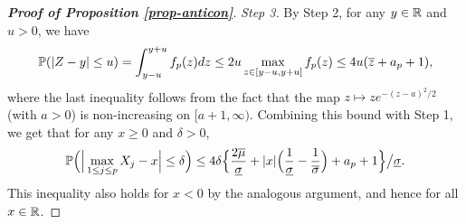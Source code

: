 \documentclass[a4paper,12pt]{article}
\numberwithin{equation}{section}
\begin{document}
\begin{proof}[\textnormal{\textbf{Proof of Proposition \ref{prop-anticon}}}]
\textit{Step 3.} By Step 2, for any $y \in \mathbb{R}$ and $u > 0$, we have
\[ \mathbb{P}( |Z - y| \le u) = \int_{y - u}^{y + u} f_p(z) dz \le 2u \max_{z \in [y-u,y+u]} f_p(z) \le 4u (\overline{z} + a_p + 1), \] 
where the last inequality follows from the fact that the map $z \mapsto z e^{-(z-a)^2/2}$ (with $a > 0$) is non-increasing on $[a+1,\infty)$. Combining this bound with Step 1, we get that for any $x \ge 0$ and $\delta > 0$, 
\begin{equation}\label{eq-bound1-Levy}
\mathbb{P} \Big( \Big| \max_{1 \le j \le p} X_j - x \Big| \le \delta \Big) \le 4\delta \Big\{ \frac{2\overline{\mu}}{\underline{\sigma}} + |x| \Big(\frac{1}{\underline{\sigma}} - \frac{1}{\overline{\sigma}}\Big) + a_p + 1 \Big\} \big/ \underline{\sigma}. 
\end{equation} 
This inequality also holds for $x < 0$ by the analogous argument, and hence for all $x \in \mathbb{R}$. 



\end{proof}
\end{document}
